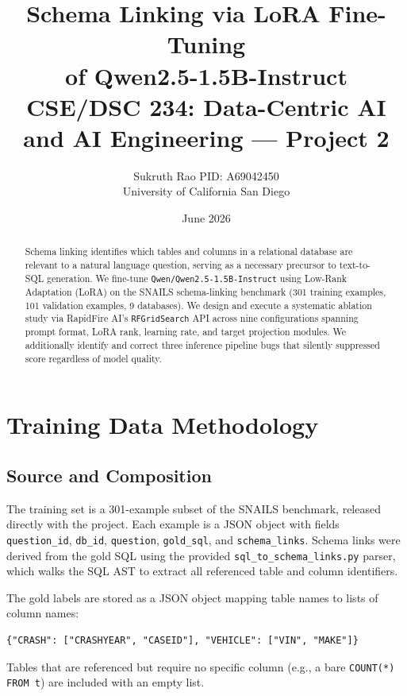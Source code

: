 \documentclass[11pt,letterpaper]{article}
\title{%
  \textbf{Schema Linking via LoRA Fine-Tuning\\of Qwen2.5-1.5B-Instruct}\\[0.4em]
  \large CSE/DSC 234: Data-Centric AI and AI Engineering --- Project 2
}
\author{
  Sukruth Rao \quad PID: A69042450\\
  University of California San Diego
}
\date{June 2026}
\begin{document}
\maketitle\thispagestyle{fancy}

\begin{abstract}
Schema linking identifies which tables and columns in a relational database are
relevant to a natural language question, serving as a necessary precursor to
text-to-SQL generation.
We fine-tune \texttt{Qwen/Qwen2.5-1.5B-Instruct} using Low-Rank Adaptation
(LoRA) on the SNAILS schema-linking benchmark (301 training examples, 101
validation examples, 9 databases).
We design and execute a systematic ablation study via RapidFire AI's
\texttt{RFGridSearch} API across nine configurations spanning prompt format,
LoRA rank, learning rate, and target projection modules.
We additionally identify and correct three inference pipeline bugs that silently
suppressed score regardless of model quality.
\end{abstract}

\section{Training Data Methodology}
\label{sec:data}

\subsection{Source and Composition}

The training set is a 301-example subset of the SNAILS benchmark, released
directly with the project.
Each example is a JSON object with fields \texttt{question\_id},
\texttt{db\_id}, \texttt{question}, \texttt{gold\_sql}, and
\texttt{schema\_links}.
Schema links were derived from the gold SQL using the provided
\texttt{sql\_to\_schema\_links.py} parser, which walks the SQL AST to extract
all referenced table and column identifiers.

The gold labels are stored as a JSON object mapping table names to lists of
column names:
\begin{lstlisting}
{"CRASH": ["CRASHYEAR", "CASEID"], "VEHICLE": ["VIN", "MAKE"]}
\end{lstlisting}
Tables that are referenced but require no specific column (e.g., a bare
\texttt{COUNT(*) FROM t}) are included with an empty list.
\end{document}
